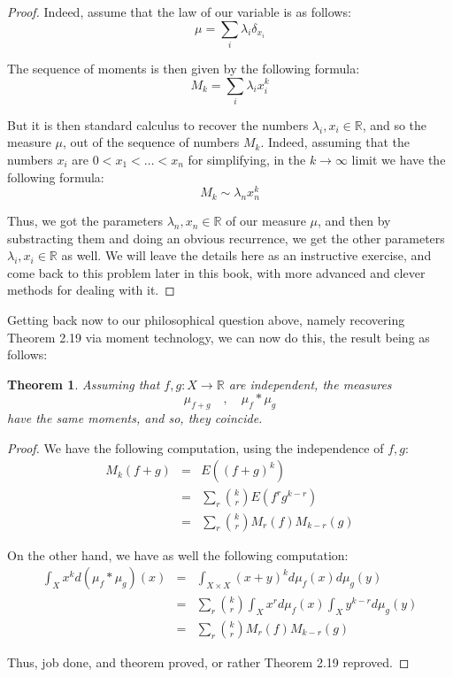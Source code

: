 \documentclass[12pt]{amsbook}
\newtheorem{theorem}{Theorem}[chapter]
\begin{document}
\begin{proof}
Indeed, assume that the law of our variable is as follows:
$$\mu=\sum_i\lambda_i\delta_{x_i}$$

The sequence of moments is then given by the following formula:
$$M_k=\sum_i\lambda_ix_i^k$$

But it is then standard calculus to recover the numbers $\lambda_i,x_i\in\mathbb R$, and so the measure $\mu$, out of the sequence of numbers $M_k$. Indeed, assuming that the numbers $x_i$ are $0<x_1<\ldots<x_n$ for simplifying, in the $k\to\infty$ limit we have the following formula:
$$M_k\sim\lambda_nx_n^k$$

Thus, we got the parameters $\lambda_n,x_n\in\mathbb R$ of our measure $\mu$, and then by substracting them and doing an obvious recurrence, we get the other parameters $\lambda_i,x_i\in\mathbb R$ as well. We will leave the details here as an instructive exercise, and come back to this problem later in this book, with more advanced and clever methods for dealing with it.
\end{proof}

Getting back now to our philosophical question above, namely recovering Theorem 2.19 via moment technology, we can now do this, the result being as follows:

\begin{theorem}
Assuming that $f,g:X\to\mathbb R$ are independent, the measures
$$\mu_{f+g}\quad,\quad\mu_f*\mu_g$$
have the same moments, and so, they coincide.
\end{theorem}

\begin{proof}
We have the following computation, using the independence of $f,g$:
\begin{eqnarray*}
M_k(f+g)
&=&E((f+g)^k)\\
&=&\sum_r\binom{k}{r}E(f^rg^{k-r})\\
&=&\sum_r\binom{k}{r}M_r(f)M_{k-r}(g)
\end{eqnarray*}

On the other hand, we have as well the following computation:
\begin{eqnarray*}
\int_Xx^kd(\mu_f*\mu_g)(x)
&=&\int_{X\times X}(x+y)^kd\mu_f(x)d\mu_g(y)\\
&=&\sum_r\binom{k}{r}\int_Xx^rd\mu_f(x)\int_Xy^{k-r}d\mu_g(y)\\
&=&\sum_r\binom{k}{r}M_r(f)M_{k-r}(g)
\end{eqnarray*}

Thus, job done, and theorem proved, or rather Theorem 2.19 reproved.
\end{proof}
\end{document}
